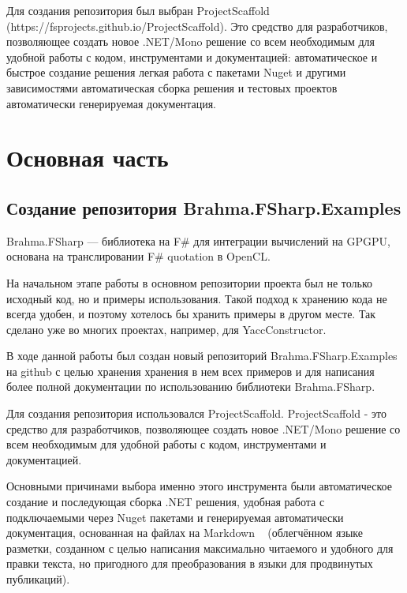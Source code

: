 \documentclass[14pt]{matmex-diploma}
\begin{document}
Для создания репозитория был выбран ProjectScaffold \linebreak (https://fsprojects.github.io/ProjectScaffold). Это средство для разработчиков, позволяющее создать новое .NET/Mono решение со всем необходимым для удобной работы с кодом, инструментами и документацией: 
автоматическое и быстрое создание решения 
легкая работа с пакетами Nuget и другими зависимостями
автоматическая сборка решения и тестовых проектов
автоматически генерируемая документация.

\section {Основная часть}
\subsection{Создание репозитория Brahma.FSharp.Examples}

Brahma.FSharp  — библиотека на F# для интеграции вычислений на GPGPU, основана на транслировании F# quotation в OpenCL.
 
На начальном этапе работы в основном репозитории проекта был не только исходный код, но и примеры использования. Такой подход к хранению кода не всегда удобен, и  поэтому хотелось бы хранить примеры в другом месте. Так сделано уже во многих проектах, например, для YaccConstructor.
 
В ходе данной работы был создан новый репозиторий \linebreak Brahma.FSharp.Examples на github с целью хранения хранения в нем всех примеров и для написания более полной документации по \linebreak использованию библиотеки \linebreak Brahma.FSharp.
 
Для создания репозитория использовался ProjectScaffold. \linebreak ProjectScaffold - это средство для разработчиков, позволяющее создать новое .NET/Mono решение со всем необходимым для удобной работы с кодом, инструментами и документацией.

Основными причинами выбора именно этого инструмента были автоматическое создание и  последующая сборка .NET решения, удобная работа с подключаемыми через Nuget пакетами и генерируемая автоматически  документация, основанная на файлах на Markdown ~\cite{markdown} (облегчённом языке разметки, созданном с целью написания максимально читаемого и удобного для правки текста, но пригодного для преобразования в языки для продвинутых публикаций).
\end{document}
